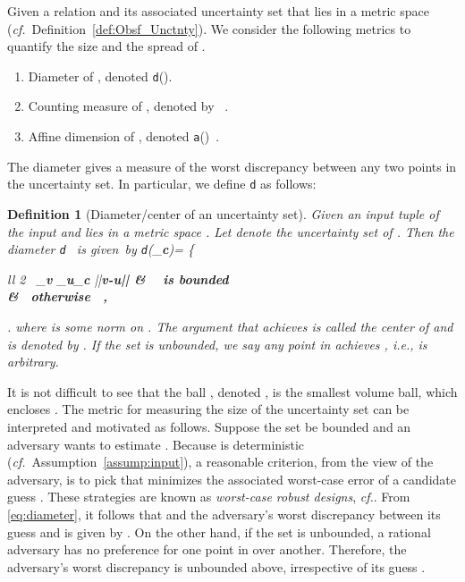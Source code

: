\documentclass[12pt,draftcls,onecolumn]{IEEEtran}
\newtheorem{defin}{Definition}\newtheorem{assump}{Assumption}
\newcommand{\be}{}
\newcommand{\cf}{{\textit{cf.}}}
\renewcommand{\vec}[1]{\bf{#1}}     \newcommand{\vecsc}[1]{\mbox {\boldmath \scriptsize }}     \newcommand{\itvec}[1]{\mbox {\boldmath }}
\newcommand{\addnew}[1]{{{\color{blue!0!black}#1}}}
\begin{document}
\addnew{Given a relation  and its associated uncertainty set  that lies in a metric space  (\cf~Definition~\ref{def:Obsf_Unctnty}). We consider the following metrics to quantify the size and the spread of .
\begin{enumerate}
\item Diameter of , denoted \texttt{d}().
\item Counting measure of , denoted by ~\cite[p.~146]{McDonald-Weiss-2013}.
\item Affine dimension of , denoted \texttt{a}()~\cite[\S~2.1.3]{Boyd-Vandenberghe-04}.
\end{enumerate}
}



\addnew{
The diameter gives a measure of the worst discrepancy between any two points in the uncertainty set. In particular, we define \texttt{d} as follows:
\begin{defin}[Diameter/center of an uncertainty set]\label{def:adversary_attackmodel}
Given an input tuple  of the input  and  lies in a metric space . Let  denote the uncertainty set of . Then the diameter \texttt{d}~ is given~by
\be\label{eq:diameter}
\hspace{-0mm}\texttt{d}(\mathcal{U}_{\vec c}){=} \left\{\hspace{-1mm} \begin{array}{ll}
   2 \ \inf_{\vec v} \sup_{{\vec u}\in\mathcal{U}_{\vec c}} ||\vec v-u|| & \  \textrm{ is bounded}\\
  \infty  & \ \mbox{otherwise} \ ,
   \end{array} \right.
\ee
where  is some norm on . The argument  that achieves  is called the \emph{center} of  and is denoted by . If the set  is unbounded, we say any point in  achieves , i.e.,  is arbitrary.
\hfill 
\end{defin}

It is not difficult to see that the ball , denoted , is the smallest volume ball, which encloses . The metric  for measuring the size of the uncertainty set  can be interpreted and motivated as follows. Suppose the set  be bounded and an adversary wants to estimate . Because  is deterministic (\cf~Assumption~\ref{assump:input}), a reasonable criterion, from the view of the adversary, is to pick  that minimizes the associated worst-case
error  of a candidate guess . These strategies are known as \emph{worst-case robust designs}, \cf \cite[\S~6.4.2]{Boyd-Vandenberghe-04}. From \eqref{eq:diameter}, it follows that  and the adversary's worst discrepancy between its guess  and  is given by . On the other hand, if the set  is unbounded, a rational adversary has no preference for one point in  over another. Therefore, the adversary's worst discrepancy is unbounded above, irrespective of its guess .


}
\end{document}
